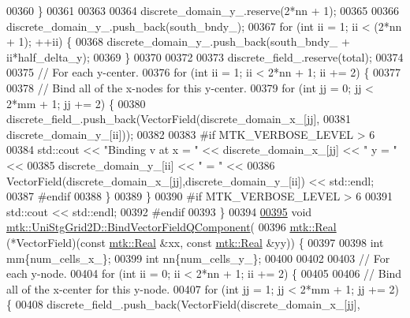 \begin{DoxyCode}
00360   \}
00361 
00363 
00364   discrete\_domain\_y\_.reserve(2*nn + 1);
00365 
00366   discrete\_domain\_y\_.push\_back(south\_bndy\_);
00367   \textcolor{keywordflow}{for} (\textcolor{keywordtype}{int} ii = 1; ii < (2*nn + 1); ++ii) \{
00368     discrete\_domain\_y\_.push\_back(south\_bndy\_ + ii*half\_delta\_y);
00369   \}
00370 
00372 
00373   discrete\_field\_.reserve(total);
00374 
00375   \textcolor{comment}{// For each y-center.}
00376   \textcolor{keywordflow}{for} (\textcolor{keywordtype}{int} ii = 1; ii < 2*nn + 1; ii += 2) \{
00377 
00378     \textcolor{comment}{// Bind all of the x-nodes for this y-center.}
00379     \textcolor{keywordflow}{for} (\textcolor{keywordtype}{int} jj = 0; jj < 2*mm + 1; jj += 2) \{
00380       discrete\_field\_.push\_back(VectorField(discrete\_domain\_x\_[jj],
00381                                             discrete\_domain\_y\_[ii]));
00382 
00383 \textcolor{preprocessor}{      #if MTK\_VERBOSE\_LEVEL > 6}
00384       std::cout << \textcolor{stringliteral}{"Binding v at x = "} << discrete\_domain\_x\_[jj] << \textcolor{stringliteral}{" y = "} <<
00385         discrete\_domain\_y\_[ii] << \textcolor{stringliteral}{" = "} <<
00386         VectorField(discrete\_domain\_x\_[jj],discrete\_domain\_y\_[ii]) << std::endl;
00387 \textcolor{preprocessor}{      #endif}
00388     \}
00389   \}
00390 \textcolor{preprocessor}{  #if MTK\_VERBOSE\_LEVEL > 6}
00391   std::cout << std::endl;
00392 \textcolor{preprocessor}{  #endif}
00393 \}
00394 
\hypertarget{mtk__uni__stg__grid__2d_8cc_source_l00395}{}\hyperlink{classmtk_1_1UniStgGrid2D_a9643167e149da2ea4e57fd12cb9f1a97}{00395} \textcolor{keywordtype}{void} \hyperlink{classmtk_1_1UniStgGrid2D_a9643167e149da2ea4e57fd12cb9f1a97}{mtk::UniStgGrid2D::BindVectorFieldQComponent}(
00396   \hyperlink{group__c01-roots_gac080bbbf5cbb5502c9f00405f894857d}{mtk::Real} (*VectorField)(\textcolor{keyword}{const} \hyperlink{group__c01-roots_gac080bbbf5cbb5502c9f00405f894857d}{mtk::Real} &xx, \textcolor{keyword}{const} 
      \hyperlink{group__c01-roots_gac080bbbf5cbb5502c9f00405f894857d}{mtk::Real} &yy)) \{
00397 
00398   \textcolor{keywordtype}{int} mm\{num\_cells\_x\_\};
00399   \textcolor{keywordtype}{int} nn\{num\_cells\_y\_\};
00400 
00402 
00403   \textcolor{comment}{// For each y-node.}
00404   \textcolor{keywordflow}{for} (\textcolor{keywordtype}{int} ii = 0; ii < 2*nn + 1; ii += 2) \{
00405 
00406     \textcolor{comment}{// Bind all of the x-center for this y-node.}
00407     \textcolor{keywordflow}{for} (\textcolor{keywordtype}{int} jj = 1; jj < 2*mm + 1; jj += 2) \{
00408       discrete\_field\_.push\_back(VectorField(discrete\_domain\_x\_[jj],

\end{DoxyCode}
